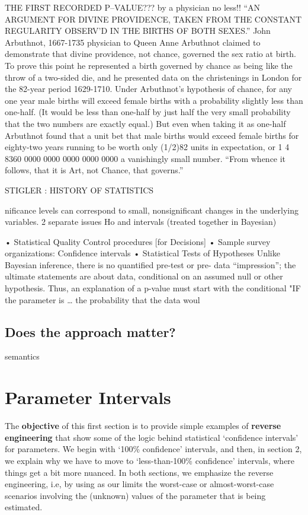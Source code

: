 \documentclass[]{book}
\begin{document}
THE FIRST RECORDED P--VALUE??? by a physician no less!!
``AN ARGUMENT FOR DIVINE PROVIDENCE, TAKEN FROM THE CONSTANT REGULARITY OBSERV'D IN THE BIRTHS OF BOTH SEXES.''
John Arbuthnot, 1667-1735 physician to Queen Anne
Arbuthnot claimed to demonstrate that divine providence, not chance, governed the sex ratio at birth.
To prove this point he represented a birth governed by chance as being like the throw of a two-sided die, and he presented data on the christenings in London for the 82-year period 1629-1710.
Under Arbuthnot's hypothesis of chance, for any one year male births will exceed female births with a probability slightly less than one-half. (It would be less than one-half by just half the very small probability that the two numbers are exactly equal.)
But even when taking it as one-half Arbuthnot found that a unit bet that male births would exceed female births for eighty-two years running to be worth only (1/2)82 units in expectation, or
1
4 8360 0000 0000 0000 0000 0000
a vanishingly small number.
``From whence it follows, that it is Art, not Chance, that governs.''

STIGLER : HISTORY OF STATISTICS

nificance levels can correspond to small, nonsignificant changes in the underlying variables.
2 separate issues Ho and intervals
(treated together in Bayesian)

• Statistical Quality Control procedures {[}for Decisions{]} • Sample survey organizations: Confidence intervals • Statistical Tests of Hypotheses
Unlike Bayesian inference, there is no quantified pre-test or pre- data ``impression''; the ultimate statements are about data, conditional on an assumed null or other hypothesis.
Thus, an explanation of a p-value must start with the conditional "IF the parameter is \ldots{} the probability that the data woul

\hypertarget{does-the-approach-matter}{%
\section{Does the approach matter?}\label{does-the-approach-matter}}

semantics

\hypertarget{CI}{%
\chapter{Parameter Intervals}\label{CI}}

The \textbf{objective} of this first section is to provide simple examples of \textbf{reverse engineering} that show some of the logic behind statistical `confidence intervals' for parameters. We begin with `100\% confidence' intervals, and then, in section 2, we explain why we have to move to `less-than-100\% confidence' intervals, where things get a bit more nuanced.
In both sections, we emphasize the reverse engineering, i.e, by using as our limits the worst-case or almost-worst-case scenarios involving the (unknown) values of the parameter that is being estimated.
\end{document}
